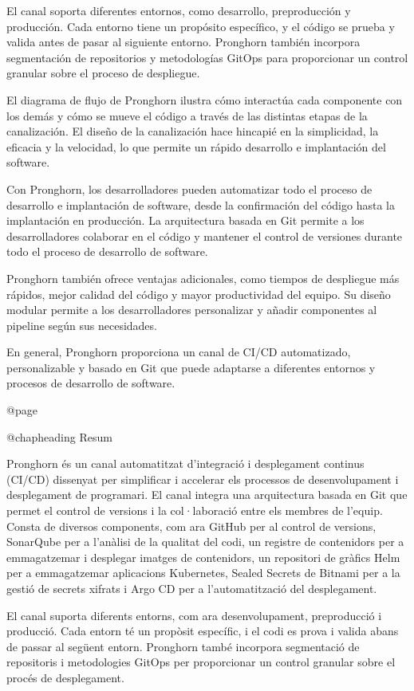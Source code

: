 El canal soporta diferentes entornos, como desarrollo, preproducción y producción. Cada entorno tiene un propósito específico, y el código se prueba y valida antes de pasar al siguiente entorno. Pronghorn también incorpora segmentación de repositorios y metodologías GitOps para proporcionar un control granular sobre el proceso de despliegue.

El diagrama de flujo de Pronghorn ilustra cómo interactúa cada componente con los demás y cómo se mueve el código a través de las distintas etapas de la canalización. El diseño de la canalización hace hincapié en la simplicidad, la eficacia y la velocidad, lo que permite un rápido desarrollo e implantación del software.

Con Pronghorn, los desarrolladores pueden automatizar todo el proceso de desarrollo e implantación de software, desde la confirmación del código hasta la implantación en producción. La arquitectura basada en Git permite a los desarrolladores colaborar en el código y mantener el control de versiones durante todo el proceso de desarrollo de software.

Pronghorn también ofrece ventajas adicionales, como tiempos de despliegue más rápidos, mejor calidad del código y mayor productividad del equipo. Su diseño modular permite a los desarrolladores personalizar y añadir componentes al pipeline según sus necesidades.

En general, Pronghorn proporciona un canal de CI/CD automatizado, personalizable y basado en Git que puede adaptarse a diferentes entornos y procesos de desarrollo de software.

@page

@chapheading Resum

Pronghorn és un canal automatitzat d'integració i desplegament continus (CI/CD) dissenyat per simplificar i accelerar els processos de desenvolupament i desplegament de programari. El canal integra una arquitectura basada en Git que permet el control de versions i la col·laboració entre els membres de l'equip. Consta de diversos components, com ara GitHub per al control de versions, SonarQube per a l'anàlisi de la qualitat del codi, un registre de contenidors per a emmagatzemar i desplegar imatges de contenidors, un repositori de gràfics Helm per a emmagatzemar aplicacions Kubernetes, Sealed Secrets de Bitnami per a la gestió de secrets xifrats i Argo CD per a l'automatització del desplegament.

El canal suporta diferents entorns, com ara desenvolupament, preproducció i producció. Cada entorn té un propòsit específic, i el codi es prova i valida abans de passar al següent entorn. Pronghorn també incorpora segmentació de repositoris i metodologies GitOps per proporcionar un control granular sobre el procés de desplegament.

